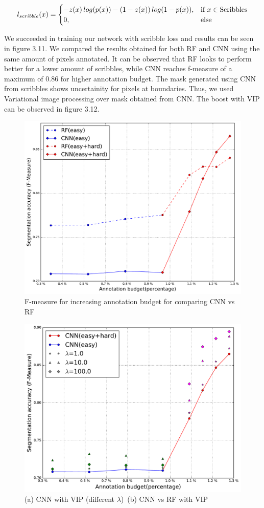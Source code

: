 \begin{align*}
\mathop{{}l_{scribble}}(x) =
\begin{cases}
  -z(x)\,log(p(x)) - (1 - z(x))\,log(1 - p(x)), & \text{if}\ x \in \text{Scribbles}  \\
  0, & \text{else}
\end{cases}
\end{align*}

We succeeded in training our network with scribble loss and results can be seen in figure 3.11. We compared the results obtained for both RF and CNN using the same amount of pixels annotated. It can be observed that RF looks to perform better for a lower amount of scribbles, while CNN reaches f-measure of a maximum of 0.86 for higher annotation budget.
The mask generated using CNN from scribbles shows uncertainity for pixels at boundaries. Thus, we used Variational image processing over mask obtained from CNN. The boost with VIP can be observed in figure 3.12.
\begin{figure}[h!] \label{fig:cnnvip}
 \includegraphics[width=1.0\linewidth]{figures/cnn_vs_rf.pdf} 
\caption{F-measure for increasing annotation budget for comparing CNN vs RF}
\end{figure}

\begin{figure}[h!] \label{fig:cnnvip}
 \includegraphics[width=0.8\linewidth]{figures/cnn_vip.pdf}
 \caption{(a) CNN with VIP (different $\lambda$)\, (b) CNN vs RF with VIP}
\end{figure}


